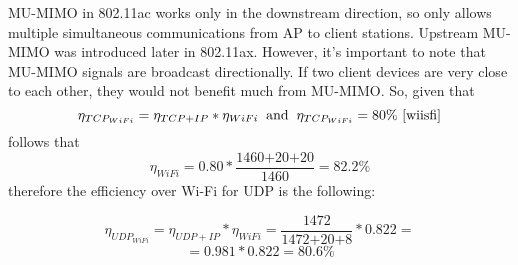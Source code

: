MU-MIMO in 802.11ac works only in the downstream direction, so only allows multiple simultaneous communications from AP to client stations. Upstream MU-MIMO was introduced later in 802.11ax. 
However, it's important to note that MU-MIMO signals are broadcast directionally. If two client devices are very close to each other, they would not benefit much from MU-MIMO. 
So, given that \[ \eta_{TCP_{WiFi}} = \eta_{TCP+IP} * \eta_{WiFi} \hspace{0.2cm} \text{and}  \hspace{0.2cm} \eta_{TCP_{WiFi}} = 80\%  ~\cite{wiisfi}\] follows that \[\eta_{WiFi} = 0.80 * \frac{\text{1460+20+20}}{\text{1460}} = 82.2 \% \]
therefore the efficiency over Wi-Fi for UDP is the following:

\[ \eta_{UDP_{WiFi}} = \eta_{UDP+IP} * \eta_{WiFi} = \frac{\text{1472}}{\text{1472+20+8}} * 0.822 = \] \[ = 0.981 * 0.822 = 80.6\% \]


